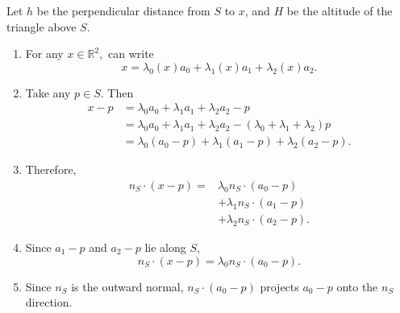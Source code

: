 \documentclass[12pt,a4paper]{article}
\begin{document}
Let $h$ be the perpendicular distance from $S$ to $x$, and $H$ be the altitude of the triangle above $S$.

\begin{enumerate}[label=\roman*)]
    \item For any $x \in \mathbb{R}^2,$ can write
    \begin{equation}
        x=\lambda_0(x)a_0+\lambda_1(x)a_1+\lambda_2(x)a_2.
    \end{equation}

    \item Take any $p\in S$. Then
    \begin{align}
        x-p
         &=\lambda_0a_0+\lambda_1a_1+\lambda_2a_2-p\\
         &=\lambda_0a_0+\lambda_1a_1+\lambda_2a_2
            -(\lambda_0+\lambda_1+\lambda_2)p\\
         &=\lambda_0(a_0-p)+\lambda_1(a_1-p)
               +\lambda_2(a_2-p).
    \end{align}

    \item Therefore,
    \begin{equation}
    \begin{aligned}
        n_S\cdot(x-p)
          ={}&\lambda_0n_S\cdot(a_0-p)\\
             &+\lambda_1n_S\cdot(a_1-p)\\
             &+\lambda_2n_S\cdot(a_2-p).
    \end{aligned}
    \end{equation}

    \item Since $a_1-p$ and $a_2-p$ lie along $S$,
    \begin{equation}
        n_S\cdot(x-p)=\lambda_0n_S\cdot(a_0-p).
    \end{equation}

    \item Since $n_S$ is the outward normal, $n_S\cdot(a_0-p)$ projects $a_0-p$ onto the $n_S$ direction.

    \begin{figure}[htbp]
    \centering
    \end{figure}


\end{enumerate}
\end{document}
